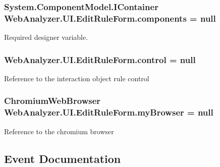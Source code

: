 \subsubsection[{components}]{\setlength{\rightskip}{0pt plus 5cm}System.\+Component\+Model.\+I\+Container Web\+Analyzer.\+U\+I.\+Edit\+Rule\+Form.\+components = null\hspace{0.3cm}{\ttfamily [private]}}\label{class_web_analyzer_1_1_u_i_1_1_edit_rule_form_ab218f619b261a307316cbb5b01a79c1b}


Required designer variable. 

\hypertarget{class_web_analyzer_1_1_u_i_1_1_edit_rule_form_a9d1ff11c0ffd1f01406c687f6b10a873}{}
\subsubsection[{control}]{ Web\+Analyzer.\+U\+I.\+Edit\+Rule\+Form.\+control = null\hspace{0.3cm}{\ttfamily [private]}}\label{class_web_analyzer_1_1_u_i_1_1_edit_rule_form_a9d1ff11c0ffd1f01406c687f6b10a873}


Reference to the interaction object rule control 

\hypertarget{class_web_analyzer_1_1_u_i_1_1_edit_rule_form_a13a68bf348e8745e5ea013dc3a3f4ea6}{}
\subsubsection[{my\+Browser}]{\setlength{\rightskip}{0pt plus 5cm}Chromium\+Web\+Browser Web\+Analyzer.\+U\+I.\+Edit\+Rule\+Form.\+my\+Browser = null\hspace{0.3cm}{\ttfamily [private]}}\label{class_web_analyzer_1_1_u_i_1_1_edit_rule_form_a13a68bf348e8745e5ea013dc3a3f4ea6}


Reference to the chromium browser 



\subsection{Event Documentation}
\hypertarget{class_web_analyzer_1_1_u_i_1_1_edit_rule_form_a270cf87236a05ce56741d8df75a16a0c}{}
